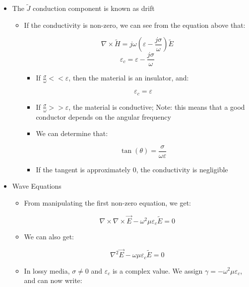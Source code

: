 \begin{itemize}
  \item The $\tilde{J}$ conduction component is known as drift

    \begin{itemize}

      \item If the conductivity is non-zero, we can see from the equation above that:

        $$\nabla\times\tilde{H}=j\omega\left( \varepsilon-\frac{j\sigma}{\omega} \right)\tilde{E}$$
        $$\varepsilon_c=\varepsilon-\frac{j\sigma}{\omega}$$

        \begin{itemize}

          \item If $\frac{\sigma}{\omega}<<\varepsilon$, then the material is an insulator, and:

            $$\varepsilon_c=\varepsilon$$

          \item If $\frac{\sigma}{\omega}>>\varepsilon$, the material is conductive; Note: this means that a good conductor depends on the angular frequency

          \item We can determine that:

            $$\tan(\theta)=\frac{\sigma}{\omega\varepsilon}$$

          \item If the tangent is approximately 0, the conductivity is negligible

        \end{itemize}

    \end{itemize}

  \item Wave Equations

    \begin{itemize}

      \item From manipulating the first non-zero equation, we get:

        $$\nabla\times\nabla\times\vec{E}-\omega^2\mu\varepsilon_c\tilde{E}=0$$

      \item We can also get:

        $$\nabla^2\vec{E}-\omega\mu\varepsilon_c\tilde{E}=0$$

      \item In lossy media, $\sigma\neq0$ and $\varepsilon_c$ is a complex value. We assign $\gamma=-\omega^2\mu\varepsilon_c$, and can now write:


\end{itemize}
\end{itemize}
